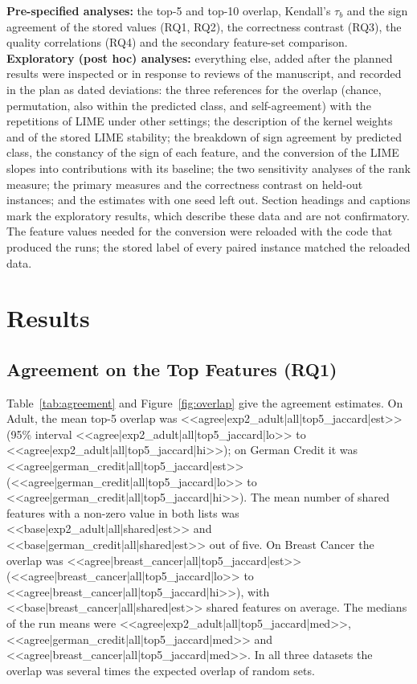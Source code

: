 \textbf{Pre-specified analyses:} the top-5 and top-10 overlap, Kendall's $\tau_b$ and the
sign agreement of the stored values (RQ1, RQ2), the correctness contrast (RQ3), the
quality correlations (RQ4) and the secondary feature-set comparison.
\textbf{Exploratory (post hoc) analyses:} everything else, added after the planned results
were inspected or in response to reviews of the manuscript, and recorded in the plan as
dated deviations: the three references for the overlap (chance, permutation, also within
the predicted class, and self-agreement) with the repetitions of LIME under other settings;
the description of the kernel weights and of the stored LIME stability; the breakdown of
sign agreement by predicted class, the constancy of the sign of each feature, and the
conversion of the LIME slopes into contributions with its baseline; the two sensitivity
analyses of the rank measure; the primary measures and the correctness contrast on
held-out instances; and the estimates with one seed left out. Section headings and
captions mark the exploratory results, which describe these data and are not
confirmatory. The feature values needed for
the conversion were reloaded with the code that produced the runs; the stored label of
every paired instance matched the reloaded data.

\section{Results}
\label{sec:results}

\subsection{Agreement on the Top Features (RQ1)}
\label{sec:results:rq1}

Table~\ref{tab:agreement} and Figure~\ref{fig:overlap} give the agreement estimates. On
Adult, the mean top-5 overlap was <<agree|exp2_adult|all|top5_jaccard|est>> (95\%
interval <<agree|exp2_adult|all|top5_jaccard|lo>> to
<<agree|exp2_adult|all|top5_jaccard|hi>>); on German Credit it was
<<agree|german_credit|all|top5_jaccard|est>> (<<agree|german_credit|all|top5_jaccard|lo>>
to <<agree|german_credit|all|top5_jaccard|hi>>). The mean number of shared features with a non-zero value in both
lists was <<base|exp2_adult|all|shared|est>> and <<base|german_credit|all|shared|est>> out
of five. On Breast Cancer the overlap was
<<agree|breast_cancer|all|top5_jaccard|est>> (<<agree|breast_cancer|all|top5_jaccard|lo>>
to <<agree|breast_cancer|all|top5_jaccard|hi>>), with <<base|breast_cancer|all|shared|est>> shared features on average. The medians of the run means were
<<agree|exp2_adult|all|top5_jaccard|med>>, <<agree|german_credit|all|top5_jaccard|med>> and
<<agree|breast_cancer|all|top5_jaccard|med>>. In all three datasets the
overlap was several times the expected overlap of random sets.

